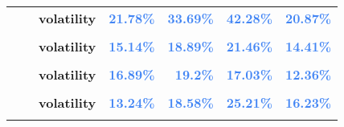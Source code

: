 \documentclass[
  authoryear,
  preprint,
  3p]{elsarticle}
\begin{document}
\begin{longtable}[t]{>{}l>{}l>{}l>{}r>{}r>{}r>{}r}
\textbf{} & \textbf{} & \textbf{volatility} & \textcolor[HTML]{4285f4}{\textbf{21.78\%}} & \textcolor[HTML]{4285f4}{\textbf{33.69\%}} & \textcolor[HTML]{4285f4}{\textbf{42.28\%}} & \textcolor[HTML]{4285f4}{\textbf{20.87\%}}\\
\addlinespace
\textbf{\cellcolor{gray!10}{Gold (XCEC)}} & \textbf{\cellcolor{gray!10}{whole period}} & \textbf{\cellcolor{gray!10}{mean}} & \textcolor[HTML]{4285f4}{\textbf{\cellcolor{gray!10}{4.5\%}}} & \textcolor[HTML]{4285f4}{\textbf{\cellcolor{gray!10}{14.35\%}}} & \textcolor[HTML]{4285f4}{\textbf{\cellcolor{gray!10}{14.01\%}}} & \textcolor[HTML]{4285f4}{\textbf{\cellcolor{gray!10}{0.53\%}}}\\
\textbf{} & \textbf{} & \textbf{volatility} & \textcolor[HTML]{4285f4}{\textbf{15.14\%}} & \textcolor[HTML]{4285f4}{\textbf{18.89\%}} & \textcolor[HTML]{4285f4}{\textbf{21.46\%}} & \textcolor[HTML]{4285f4}{\textbf{14.41\%}}\\
\textbf{\cellcolor{gray!10}{}} & \textbf{\cellcolor{gray!10}{backwardation}} & \textbf{\cellcolor{gray!10}{mean}} & \textcolor[HTML]{4285f4}{\textbf{\cellcolor{gray!10}{9.19\%}}} & \textcolor[HTML]{4285f4}{\textbf{\cellcolor{gray!10}{13.37\%}}} & \textcolor[HTML]{4285f4}{\textbf{\cellcolor{gray!10}{9.37\%}}} & \textcolor[HTML]{4285f4}{\textbf{\cellcolor{gray!10}{4.21\%}}}\\
\textbf{} & \textbf{} & \textbf{volatility} & \textcolor[HTML]{4285f4}{\textbf{16.89\%}} & \textcolor[HTML]{4285f4}{\textbf{19.2\%}} & \textcolor[HTML]{4285f4}{\textbf{17.03\%}} & \textcolor[HTML]{4285f4}{\textbf{12.36\%}}\\
\textbf{\cellcolor{gray!10}{}} & \textbf{\cellcolor{gray!10}{contango}} & \textbf{\cellcolor{gray!10}{mean}} & \textcolor[HTML]{4285f4}{\textbf{\cellcolor{gray!10}{-0.01\%}}} & \textcolor[HTML]{4285f4}{\textbf{\cellcolor{gray!10}{15.37\%}}} & \textcolor[HTML]{4285f4}{\textbf{\cellcolor{gray!10}{19.1\%}}} & \textcolor[HTML]{4285f4}{\textbf{\cellcolor{gray!10}{-3.1\%}}}\\
\addlinespace
\textbf{} & \textbf{} & \textbf{volatility} & \textcolor[HTML]{4285f4}{\textbf{13.24\%}} & \textcolor[HTML]{4285f4}{\textbf{18.58\%}} & \textcolor[HTML]{4285f4}{\textbf{25.21\%}} & \textcolor[HTML]{4285f4}{\textbf{16.23\%}}\\
\textbf{\cellcolor{gray!10}{Palladium (XNYM)}} & \textbf{\cellcolor{gray!10}{whole period}} & \textbf{\cellcolor{gray!10}{mean}} & \textcolor[HTML]{4285f4}{\textbf{\cellcolor{gray!10}{9.12\%}}} & \textcolor[HTML]{4285f4}{\textbf{\cellcolor{gray!10}{9.03\%}}} & \textcolor[HTML]{4285f4}{\textbf{\cellcolor{gray!10}{*29.12\%}}} & \textcolor[HTML]{4285f4}{\textbf{\cellcolor{gray!10}{13.75\%}}}\\

\end{longtable}
\end{document}
